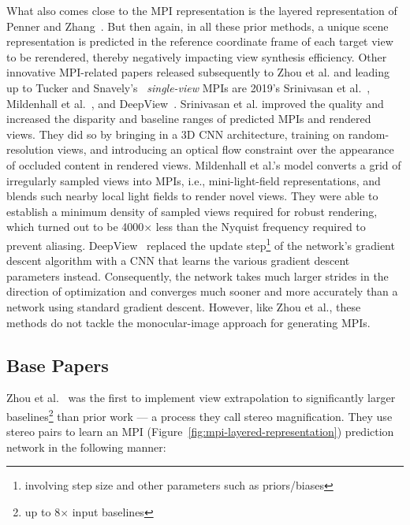 What also comes close to the MPI representation is the layered representation of Penner and Zhang~\cite{penner_soft_2017}. But then again, in all these prior methods, a unique scene representation is predicted in the reference coordinate frame of each target view to be rerendered, thereby negatively impacting view synthesis efficiency. Other innovative MPI-related papers released subsequently to Zhou et al. and leading up to Tucker and Snavely's~\cite{single_view_mpi} \textit{single-view} MPIs are 2019's Srinivasan et al.~\cite{srinivasan_pushing_2019}, Mildenhall et al.~\cite{mildenhall_local_2019}, and DeepView~\cite{flynn_deepview_2019}. Srinivasan et al. improved the quality and increased the disparity and baseline ranges of predicted MPIs and rendered views. They did so by bringing in a 3D CNN architecture, training on random-resolution views, and introducing an optical flow constraint over the appearance of occluded content in rendered views. Mildenhall et al.'s model converts a grid of irregularly sampled views into MPIs, i.e., mini-light-field representations, and blends such nearby local light fields to render novel views. They were able to establish a minimum density of sampled views required for robust rendering, which turned out to be 4000$\times$ less than the Nyquist frequency required to prevent aliasing. DeepView~\cite{flynn_deepview_2019} replaced the update step\footnote{involving step size and other parameters such as priors/biases} of the network's gradient descent algorithm with a CNN that learns the various gradient descent parameters instead. Consequently, the network takes much larger strides in the direction of optimization and converges much sooner and more accurately than a network using standard gradient descent. However, like Zhou et al., these methods do not tackle the monocular-image approach for generating MPIs.

\subsection{Base Papers}\label{subsec:base-papers}

Zhou et al.~\cite{zhou2018stereo} was the first to implement view extrapolation to significantly larger baselines\footnote{up to 8$\times$ input baselines} than prior work --- a process they call stereo magnification. They use stereo pairs to learn an MPI (Figure~\ref{fig:mpi-layered-representation}) prediction network in the following manner:

